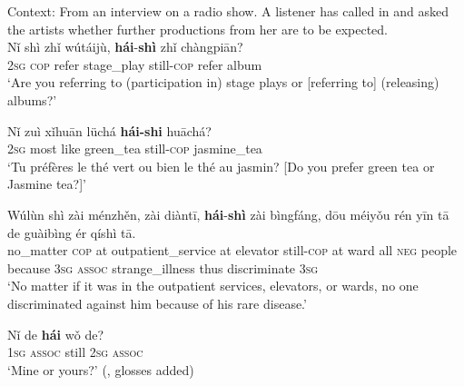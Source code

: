 \begin{exe}
	\ex Context: From an interview on a radio show. A listener has called in and asked the artists whether further productions from her are to be expected.\\
\gll Nǐ	shì	zhǐ	wútáijù,	\textbf{hái}-\textbf{shì}	zhǐ	chàngpiān?\\
	2\textsc{sg} \textsc{cop} refer stage\_play still-\textsc{cop} refer album\\
	\glt \lq Are you referring to (participation in) stage plays or  [referring to] (releasing) albums?' \parencite[63–64]{Lu2019}

	\ex
	\gll Nǐ zuì xǐhuān lüchá \textbf{hái-shi} huāchá?\\
	2\textsc{sg} most like green\_tea still-\textsc{cop} jasmine\_tea\\
	\glt \lq Tu préfères le thé vert ou bien le thé au jasmin? [Do you prefer green tea or Jasmine tea?]' \parencite[112]{Donazzan2008}
	
	\largerpage[-1]
	\pagebreak
	\ex\label{exAppendixMandarinDisjunctive2}
	\gll Wúlùn		shì	zài	ménzhěn,	zài	diàntī,	\textbf{hái}-\textbf{shì}	zài	bìngfáng, dōu	méiyǒu	rén	yīn	tā	de	guàibìng	ér	qíshì	tā.\\
	no\_matter \textsc{cop} at outpatient\_service at elevator still-\textsc{cop} at ward all \textsc{neg} people because 3\textsc{sg} \textsc{assoc} strange\_illness thus discriminate 3\textsc{sg}\\
	\glt \lq No matter if it was in the outpatient services, elevators, or wards, no one discriminated against him because of his rare disease.' \parencite[399]{LinSun2016}
	
	\ex\label{exAppendixMandarinDisjunctive4}
	\gll Nǐ de \textbf{hái} wǒ de?\\
	1\textsc{sg} \textsc{assoc} still 2\textsc{sg} \textsc{assoc}\\
	\glt \lq Mine or yours?\rq{ }(\cite[339]{Wiedenhof2015}, glosses added)
\end{exe}
	



